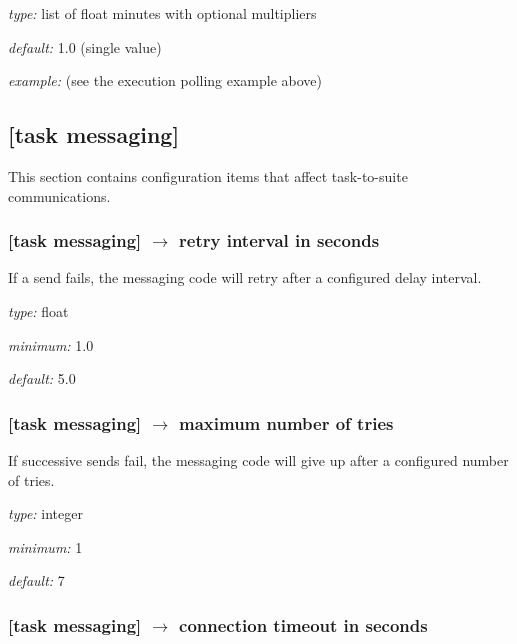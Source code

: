 \begin{myitemize}
\item {\em type:} list of float minutes with optional multipliers
\item {\em default:} 1.0 (single value)
\item {\em example:} (see the execution polling example above)
\end{myitemize}

\subsection{[task messaging]}

This section contains configuration items that affect task-to-suite
communications.

\subsubsection[retry interval in seconds]{[task messaging] $\rightarrow$ retry interval in seconds}

If a send fails, the messaging code will retry after a configured
delay interval.

\begin{myitemize}
\item {\em type:} float
\item {\em minimum:} 1.0
\item {\em default:} 5.0
\end{myitemize}

\subsubsection[maximum number of tries]{[task messaging] $\rightarrow$ maximum number of tries}

If successive sends fail, the messaging code will give up after a
configured number of tries. 

\begin{myitemize}
\item {\em type:} integer
\item {\em minimum:} 1
\item {\em default:} 7
\end{myitemize}

\subsubsection[connection timeout in seconds]{[task messaging] $\rightarrow$ connection timeout in seconds}

